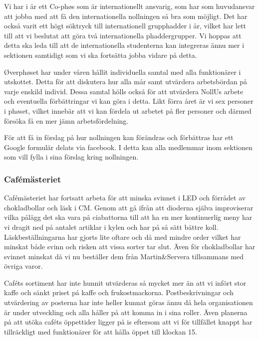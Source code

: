 \documentclass[../_main/handlingar.tex]{subfiles}
\begin{document}
Vi har i år ett Co-phøs som är internationellt ansvarig, som har som huvudansvar att jobba med att få den internationella nollningen så bra som möjligt. Det har också varit ett högt söktryck till internationell grupphadder i år, vilket har lett till att vi beslutat att göra två internationella phaddergrupper. Vi hoppas att detta ska leda till att de internationella studenterna kan integreras ännu mer i sektionen samtidigt som vi ska fortsätta jobba vidare på detta.

Øverphøset har under våren hållit individuella samtal med alla funktionärer i utskottet. Detta för att diskutera hur alla mår samt utvärdera arbetsbördan på varje enskild individ. Dessa samtal hölls också för att utvärdera NollUs arbete och eventuella förbättringar vi kan göra i detta. Likt förra året är vi sex personer i phøset, vilket innebär att vi kan fördela ut arbetet på fler personer och därmed försöka få en mer jämn arbetsfördelning. 

För att få in förslag på hur nollningen kan förändras och förbättras har ett Google formulär delats via facebook. I detta kan alla medlemmar inom sektionen som vill fylla i sina förslag kring nollningen.

\subsubsection*{Cafémästeriet}
Cafémästeriet har fortsatt arbeta för att minska svinnet i LED och förrådet av chokladbollar och läsk i CM. Genom att gå ifrån att dioderna själva improviserar vilka pålägg det ska vara på ciabattorna till att ha en mer kontinuerlig meny har vi dragit ned på antalet artiklar i kylen och har på så sätt bättre koll. Läskbeställningarna har gjorts lite oftare och då med mindre order vilket har minskat både svinn och risken att vissa sorter tar slut. Även för chokladbollar har svinnet minskat då vi nu beställer dem från Martin\&Servera tillsammans med övriga varor. 

Caféts sortiment har inte hunnit utvärderas så mycket mer än att vi infört stor kaffe och sänkt priset på kaffe och frukostmackorna. Postbeskrivningar och utvärdering av posterna har inte heller kunnat göras ännu då hela organisationen är under utveckling och alla håller på att komma in i sina roller. Även planerna på att utöka caféts öppettider ligger på is eftersom att vi för tillfället knappt har tillräckligt med funktionärer för att hålla öppet till klockan 15. 
\end{document}
